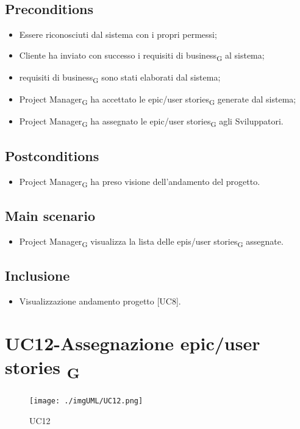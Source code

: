 \documentclass{article}
\begin{document}
    \subsection*{Preconditions}
        \begin{itemize}
            \item Essere riconosciuti dal sistema con i propri permessi;
            \item Cliente ha inviato con successo i requisiti di business\textsubscript{G} al sistema;
            \item requisiti di business\textsubscript{G} sono stati elaborati dal sistema;
            \item Project Manager\textsubscript{G} ha accettato le epic/user stories\textsubscript{G} generate dal sistema;
            \item Project Manager\textsubscript{G} ha assegnato le epic/user stories\textsubscript{G} agli Sviluppatori.
        \end{itemize}
        
    \subsection*{Postconditions}
    \begin{itemize}
        \item Project Manager\textsubscript{G} ha preso visione dell'andamento del progetto.
    \end{itemize}
    
    \subsection*{Main scenario}
        \begin{itemize}
            \item Project Manager\textsubscript{G} visualizza la lista delle epis/user stories\textsubscript{G} assegnate.
        \end{itemize}
        
    \subsection*{Inclusione}
        \begin{itemize}
            \item Visualizzazione andamento progetto [UC8].
        \end{itemize}

\section{UC12-Assegnazione epic/user stories \textsubscript{G}}
    \begin{figure}[h]
      \centering
      \texttt{[image: ./imgUML/UC12.png]}
    \caption{UC12}
      \label{fig:UC12}
    \end{figure}
\end{document}
